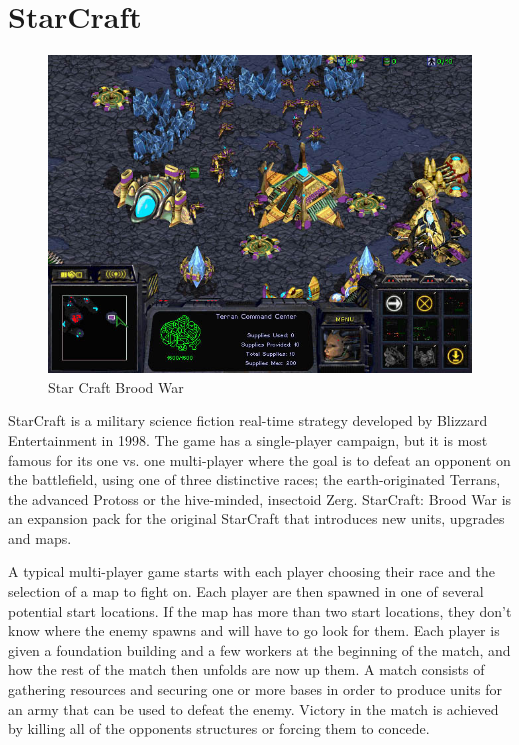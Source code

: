 
\section{StarCraft}
\label{sec:starcrafttheory}
\begin{figure}[h!tb]
\centering
\includegraphics[scale=0.5]{graphics/scbw.jpg}
\caption{Star Craft Brood War}
\label{fig:scbwIntro}
\end{figure}

StarCraft is a military science fiction real-time strategy developed by Blizzard
Entertainment in 1998.\cite{starcraft} The game has a single-player campaign,
but it is most famous for its one vs. one multi-player where the goal is to
defeat an opponent on the battlefield, using one of three distinctive races;
the earth-originated Terrans, the advanced Protoss or the hive-minded,
insectoid Zerg. StarCraft: Brood War is an expansion pack for the original
StarCraft that introduces new units, upgrades and maps. 

A typical multi-player game starts with each player choosing their race and the
selection of a map to fight on. Each player are then spawned in one of
several potential start locations. If the map has more than two start
locations, they don't know where the enemy spawns and will have to go look for
them. Each player is given a foundation building and a few workers at the
beginning of the match, and how the rest of the match then unfolds are now up
them. A match consists of gathering resources and securing one or more bases in
order to produce units for an army that can be used to defeat the enemy. Victory
in the match is achieved by killing all of the opponents structures or forcing
them to concede.

